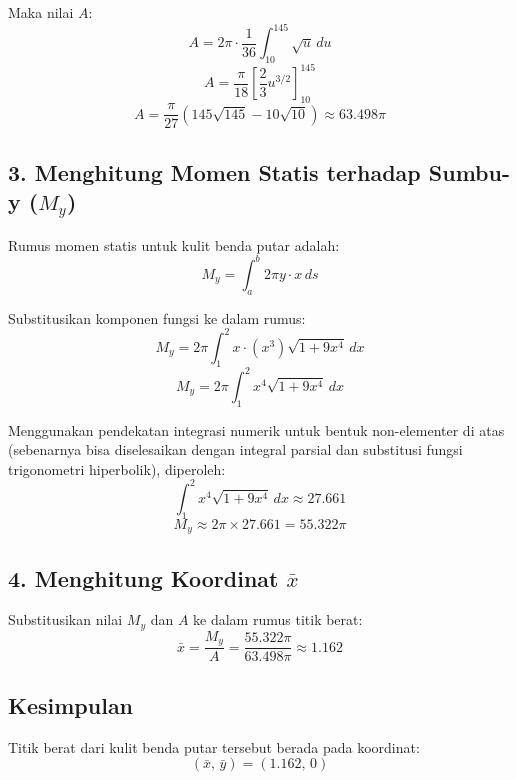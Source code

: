 \documentclass[12pt,a4paper]{article}
\begin{document}
Maka nilai $A$:
\[A = 2\pi \cdot \frac{1}{36} \int_{10}^{145} \sqrt{u} \, du \]
\[A = \frac{\pi}{18} \left[ \frac{2}{3} u^{3/2} \right]_{10}^{145} \]
\[A = \frac{\pi}{27} \left( 145\sqrt{145} - 10\sqrt{10} \right) \approx 63.498\pi\]

\subsection*{3. Menghitung Momen Statis terhadap Sumbu-y ($M_y$)}
Rumus momen statis untuk kulit benda putar adalah:
\[M_y = \int_{a}^{b} 2\pi y \cdot x \, ds\]

Substitusikan komponen fungsi ke dalam rumus:
\[M_y = 2\pi \int_{1}^{2} x \cdot (x^3) \sqrt{1 + 9x^4} \, dx \]
\[M_y = 2\pi \int_{1}^{2} x^4 \sqrt{1 + 9x^4} \, dx\]

Menggunakan pendekatan integrasi numerik untuk bentuk non-elementer di atas (sebenarnya bisa diselesaikan dengan integral parsial dan substitusi fungsi trigonometri hiperbolik), diperoleh:
\[\int_{1}^{2} x^4 \sqrt{1 + 9x^4} \, dx \approx 27.661\]
\[M_y \approx 2\pi \times 27.661 = 55.322\pi\]

\subsection*{4. Menghitung Koordinat $\bar{x}$}
Substitusikan nilai $M_y$ dan $A$ ke dalam rumus titik berat:
\[\bar{x} = \frac{M_y}{A} = \frac{55.322\pi}{63.498\pi} \approx 1.162\]

\subsection*{Kesimpulan}
Titik berat dari kulit benda putar tersebut berada pada koordinat:
\[(\bar{x}, \, \bar{y}) = (1.162, \, 0)\]
\end{document}
